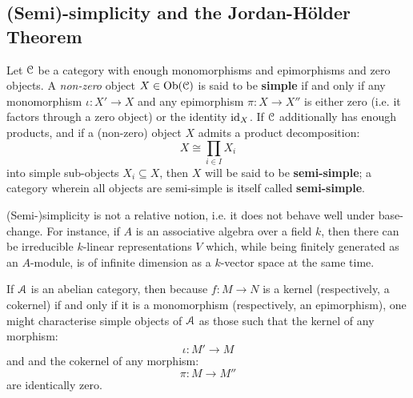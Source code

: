         \subsection{(Semi)-simplicity and the Jordan-H\"older Theorem}
            \begin{definition} \label{def: (semi)_simple_objects}
                Let $\mathcal{C}$ be a category with enough monomorphisms and epimorphisms and zero objects. A \textit{non-zero} object $X \in \mathrm{Ob}(\mathcal{C})$ is said to be \textbf{simple} if and only if any monomorphism $\iota: X' \to X$ and any epimorphism $\pi: X \to X''$ is either zero (i.e. it factors through a zero object) or the identity $\mathrm{id}_X$. If $\mathcal{C}$ additionally has enough products, and if a (non-zero) object $X$ admits a product decomposition:
                    $$X \cong \prod_{i \in I} X_i$$
                into simple sub-objects $X_i \subseteq X$, then $X$ will be said to be \textbf{semi-simple}; a category wherein all objects are semi-simple is itself called \textbf{semi-simple}.
            \end{definition}
            \begin{example}
                (Semi-)simplicity is not a relative notion, i.e. it does not behave well under base-change. For instance, if $A$ is an associative algebra over a field $k$, then there can be irreducible $k$-linear representations $V$ which, while being finitely generated as an $A$-module, is of infinite dimension as a $k$-vector space at the same time.
            \end{example}
            \begin{remark}
                If $\mathcal{A}$ is an abelian category, then because $f: M \to N$ is a kernel (respectively, a cokernel) if and only if it is a monomorphism (respectively, an epimorphism), one might characterise simple objects of $\mathcal{A}$ as those such that the kernel of any morphism:
                    $$\iota: M' \to M$$
                and and the cokernel of any morphism:
                    $$\pi: M \to M''$$
                are identically zero. 
            \end{remark}
